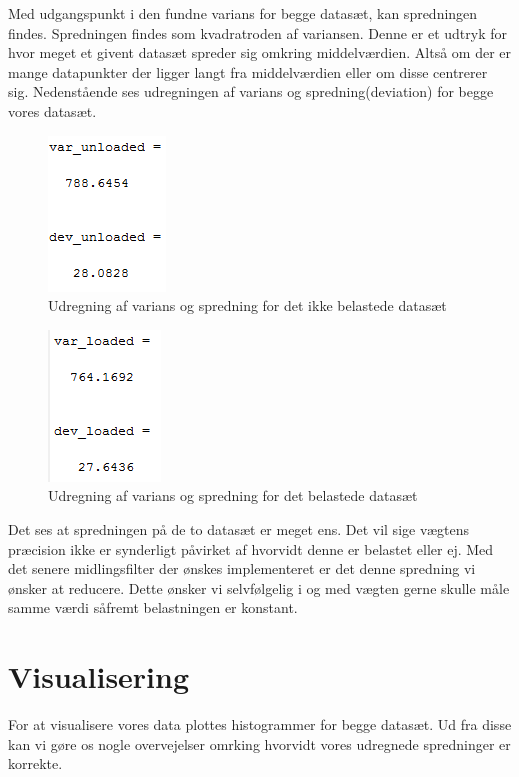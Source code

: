 Med udgangspunkt i den fundne varians for begge datasæt, kan spredningen findes. Spredningen findes som kvadratroden af variansen. Denne er et udtryk for hvor meget et givent datasæt spreder sig omkring middelværdien. Altså om der er mange datapunkter der ligger langt fra middelværdien eller om disse centrerer sig. Nedenstående ses udregningen af varians og spredning(deviation) for begge vores datasæt.

\begin{figure}[H]
\centering
\includegraphics{Img/VariansSpredningUnloaded.PNG}
\caption{Udregning af varians og spredning for det ikke belastede datasæt}
\label{fig:VariansSpredningUnloaded}
\end{figure}

\begin{figure}[H]
\centering
\includegraphics{Img/VariansSpredningloaded.PNG}
\caption{Udregning af varians og spredning for det belastede datasæt}
\label{fig:VariansSpredningloaded}
\end{figure}

Det ses at spredningen på de to datasæt er meget ens. Det vil sige vægtens præcision ikke er synderligt påvirket af hvorvidt denne er belastet eller ej. Med det senere midlingsfilter der ønskes implementeret er det denne spredning vi ønsker at reducere. Dette ønsker vi selvfølgelig i og med vægten gerne skulle måle samme værdi såfremt belastningen er konstant.
\newpage

\section{Visualisering}
For at visualisere vores data plottes histogrammer for begge datasæt. Ud fra disse kan vi gøre os nogle overvejelser omrking hvorvidt vores udregnede spredninger er korrekte. 

